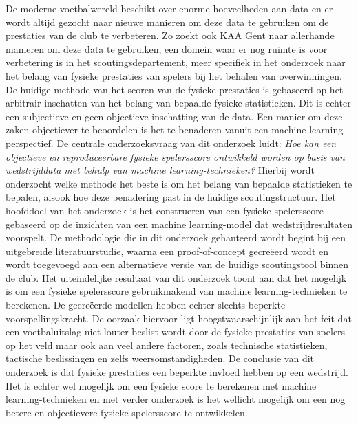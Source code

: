 De moderne voetbalwereld beschikt over enorme hoeveelheden aan data en er wordt altijd gezocht naar nieuwe manieren om deze data te gebruiken om de prestaties van de club te verbeteren. Zo zoekt ook KAA Gent naar allerhande manieren om deze data te gebruiken, een domein waar er nog ruimte is voor verbetering is in het scoutingsdepartement, meer specifiek in het onderzoek naar het belang van fysieke prestaties van spelers bij het behalen van overwinningen.
\newline \newline
De huidige methode van het scoren van de fysieke prestaties is gebaseerd op het arbitrair inschatten van het belang van bepaalde fysieke statistieken. Dit is echter een subjectieve en geen objectieve inschatting van de data. Een manier om deze zaken objectiever te beoordelen is het te benaderen vanuit een machine learning-perspectief.
\newline \newline
De centrale onderzoeksvraag van dit onderzoek luidt: \emph{Hoe kan een objectieve en reproduceerbare fysieke spelersscore ontwikkeld worden op basis van wedstrijddata met behulp van machine learning-technieken?} Hierbij wordt onderzocht welke methode het beste is om het belang van bepaalde statistieken te bepalen, alsook hoe deze benadering past in de huidige scoutingstructuur.
\newline \newline
Het hoofddoel van het onderzoek is het construeren van een fysieke spelersscore gebaseerd op de inzichten van een machine learning-model dat wedstrijdresultaten voorspelt.
\newline \newline
De methodologie die in dit onderzoek gehanteerd wordt begint bij een uitgebreide literatuurstudie, waarna een proof-of-concept gecreëerd wordt en wordt toegevoegd aan een alternatieve versie van de huidige scoutingstool binnen de club.
\newline \newline
Het uiteindelijke resultaat van dit onderzoek toont aan dat het mogelijk is om een fysieke spelersscore gebruikmakend van machine learning-technieken te berekenen. De gecreëerde modellen hebben echter slechts beperkte voorspellingskracht. De oorzaak hiervoor ligt hoogstwaarschijnlijk aan het feit dat een voetbaluitslag niet louter beslist wordt door de fysieke prestaties van spelers op het veld maar ook aan veel andere factoren, zoals technische statistieken, tactische beslissingen en zelfs weersomstandigheden.
\newline \newline
De conclusie van dit onderzoek is dat fysieke prestaties een beperkte invloed hebben op een wedstrijd. Het is echter wel mogelijk om een fysieke score te berekenen met machine learning-technieken en met verder onderzoek is het wellicht mogelijk om een nog betere en objectievere fysieke spelersscore te ontwikkelen.